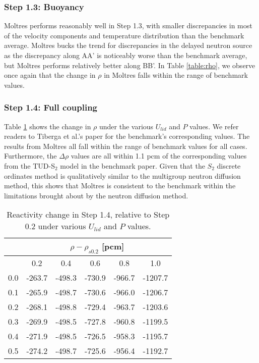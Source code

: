\subsubsection{Step 1.3: Buoyancy}

Moltres performs reasonably well in Step 1.3, with smaller
discrepancies in most of the velocity components and temperature distribution
than the benchmark average. Moltres bucks the trend for discrepancies
in the delayed neutron source as the discrepancy along AA' is
noticeably worse than the benchmark average, but Moltres performs relatively
better along BB'. In Table \ref{table:rho}, we observe once again that the
change in $\rho$ in Moltres falls within the range of benchmark values.

\subsubsection{Step 1.4: Full coupling}

Table \ref{table:full} shows the change in $\rho$ under the various $U_{lid}$
and $P$ values. We refer readers to Tiberga et al.'s paper
\citep{tiberga_results_2020} for the benchmark's corresponding values.
The results from Moltres all fall within the range of benchmark values for all
cases. Furthermore, the $\Delta\rho$ values are all within 1.1 pcm of the
corresponding values from the TUD-S$_2$ model in the benchmark paper. Given
that the $S_2$ discrete ordinates method is qualitatively similar to the
multigroup neutron diffusion method, this shows that Moltres is
consistent to the benchmark within the limitations brought about by the neutron
diffusion method.

\begin{table}[htbp!]
	\caption{Reactivity change in Step 1.4, relative to Step 0.2 under various
	$U_{lid}$ and $P$ values.}
	\centering
	\small
	\setlength\tabcolsep{1.5pt}
	\begin{tabular}{c c c c c c}
		\toprule
		& \multicolumn{5}{c}{$\rho - \rho_{s0.2}$ [pcm]} \\
		\midrule
		{\backslashbox{$U_{lid}$ [m$\cdot$s$^{-1}$]}{$P$ [GW]}} & 0.2 & 0.4 & 0.6 & 0.8 & 1.0 \\
		\midrule
		0.0 & -263.7 & -498.3 & -730.9 & -966.7 & -1207.7 \\
		0.1 & -265.9 & -498.7 & -730.6 & -966.0 & -1206.7 \\
		0.2 & -268.1 & -498.8 & -729.4 & -963.7 & -1203.6 \\
		0.3 & -269.9 & -498.5 & -727.8 & -960.8 & -1199.5 \\
		0.4 & -271.9 & -498.5 & -726.5 & -958.3 & -1195.7 \\
		0.5 & -274.2 & -498.7 & -725.6 & -956.4 & -1192.7 \\
		\bottomrule
	\end{tabular}
	\label{table:full}
\end{table}
